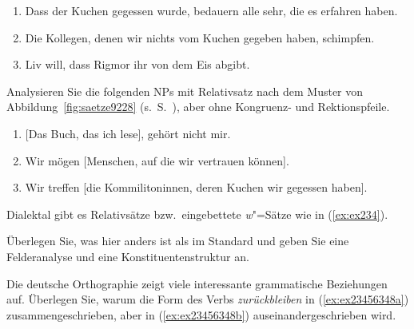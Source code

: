 \begin{enumerate}\Lf
  \item Dass der Kuchen gegessen wurde, bedauern alle sehr, die es erfahren haben.
  \item Die Kollegen, denen wir nichts vom Kuchen gegeben haben, schimpfen.
  \item Liv will, dass Rigmor ihr von dem Eis abgibt.
\end{enumerate}

\Uebung[\tristar] \label{u125} Analysieren Sie die folgenden NPs mit Relativsatz nach dem Muster von Abbildung~\ref{fig:saetze9228} (s.\ S.~\pageref{fig:saetze9228}), aber ohne Kongruenz- und Rektionspfeile.

\begin{enumerate}\Lf
  \item{[Das Buch, das ich lese], gehört nicht mir.}
  \item Wir mögen [Menschen, auf die wir vertrauen können].
  \item Wir treffen [die Kommilitoninnen, deren Kuchen wir gegessen haben].
\end{enumerate}


\Uebung[\tristar] \label{u126} Dialektal gibt es Relativsätze bzw.\ eingebettete \textit{w}"=Sätze wie in (\ref{ex:ex234}).

\begin{exe}
\end{exe}

Überlegen Sie, was hier anders ist als im Standard und geben Sie eine Felderanalyse und eine Konstituentenstruktur an.

\Uebung[\tristar] \label{u127} Die deutsche Orthographie zeigt viele interessante grammatische Beziehungen auf.
Überlegen Sie, warum die Form des Verbs \textit{zurückbleiben} in (\ref{ex:ex23456348a}) zusammengeschrieben, aber in (\ref{ex:ex23456348b}) auseinandergeschrieben wird.

\begin{exe}
  \ex\label{ex:ex23456348}
  \begin{xlist}
  \end{xlist}
\end{exe}

